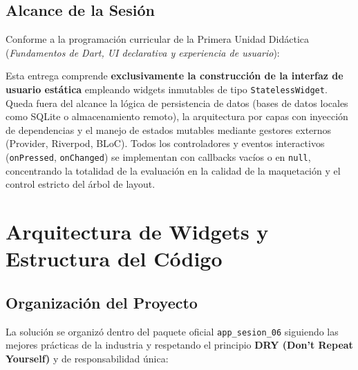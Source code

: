 \documentclass[12pt,a4paper]{article}
\begin{document}
\subsection{Alcance de la Sesión}
Conforme a la programación curricular de la Primera Unidad Didáctica (\textit{Fundamentos de Dart, UI declarativa y experiencia de usuario}):
\begin{tcolorbox}[colback=blue!5!white,colframe=blue!75!black,title=Delimitación del Alcance Técnico]
Esta entrega comprende \textbf{exclusivamente la construcción de la interfaz de usuario estática} empleando widgets inmutables de tipo \texttt{StatelessWidget}. Queda fuera del alcance la lógica de persistencia de datos (bases de datos locales como SQLite o almacenamiento remoto), la arquitectura por capas con inyección de dependencias y el manejo de estados mutables mediante gestores externos (Provider, Riverpod, BLoC). Todos los controladores y eventos interactivos (\texttt{onPressed}, \texttt{onChanged}) se implementan con callbacks vacíos o en \texttt{null}, concentrando la totalidad de la evaluación en la calidad de la maquetación y el control estricto del árbol de layout.
\end{tcolorbox}

\section{Arquitectura de Widgets y Estructura del Código}

\subsection{Organización del Proyecto}
La solución se organizó dentro del paquete oficial \texttt{app\_sesion\_06} siguiendo las mejores prácticas de la industria y respetando el principio \textbf{DRY (Don't Repeat Yourself)} y de responsabilidad única:
\end{document}
